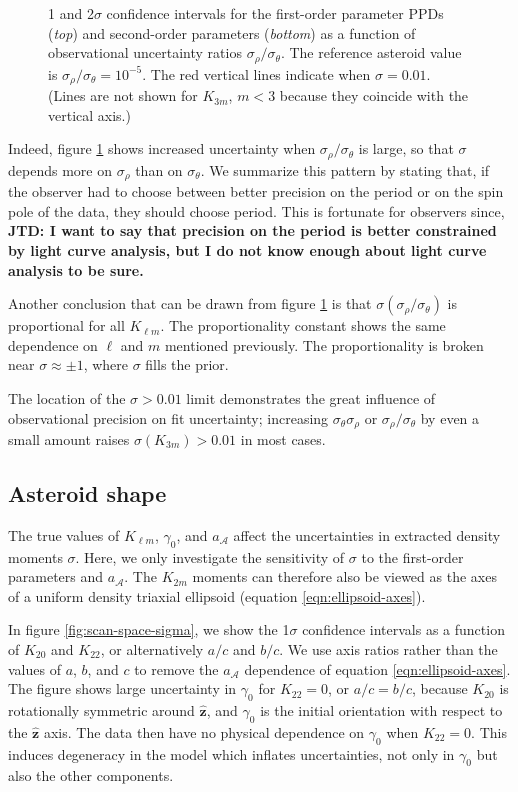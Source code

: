 \documentclass[fleqn,usenatbib]{mnras}
\newcommand{\jtd}[1]{ {\bf{\color{red} JTD: #1}} }
\newcommand{\unit}[1]{\bm{\hat{#1}}}
\begin{document}
\begin{figure}
  \caption{1 and 2$\sigma$ confidence intervals for the first-order parameter PPDs (\textit{top}) and second-order parameters (\textit{bottom}) as a function of observational uncertainty ratios $\sigma_\rho / \sigma_\theta$. The reference asteroid value is $\sigma_\rho/ \sigma_\theta =10^{-5}$. The red vertical lines indicate when $\sigma = 0.01$. (Lines are not shown for $K_{3m}$, $m < 3$ because they coincide with the vertical axis.)}
  \label{fig:scan-ratio}
\end{figure}

Indeed, figure  \ref{fig:scan-ratio} shows increased uncertainty when $\sigma_\rho/\sigma_\theta$ is large, so that $\sigma$ depends more on $\sigma_\rho$ than on $\sigma_\theta$. We summarize this pattern by stating that, if the observer had to choose between better precision on the period or on the spin pole of the data, they should choose period. This is fortunate for observers since, \jtd{I want to say that precision on the period is better constrained by light curve analysis, but I do not know enough about light curve analysis to be sure.}

Another conclusion that can be drawn from figure \ref{fig:scan-ratio} is that $\sigma(\sigma_\rho/\sigma_\theta)$ is proportional for all $K_{\ell m}$. The proportionality constant shows the same dependence on $\ell$ and $m$ mentioned previously. The proportionality is broken near $\sigma \approx \pm 1$, where $\sigma$ fills the prior.

The location of the $\sigma > 0.01$ limit demonstrates the great influence of observational precision on fit uncertainty; increasing $\sigma_\theta \sigma_\rho$ or $\sigma_\rho / \sigma_\theta$ by even a small amount raises $\sigma(K_{3m}) > 0.01$ in most cases.



\subsection{Asteroid shape}
\label{sec:scan-shape}

The true values of $K_{\ell m}$, $\gamma_0$, and $a_\mathcal{A}$ affect the uncertainties in extracted density moments $\sigma$. Here, we only investigate the sensitivity of $\sigma$ to the first-order parameters and $a_\mathcal{A}$. The $K_{2m}$ moments can therefore also be viewed as the axes of a uniform density triaxial ellipsoid (equation \ref{eqn:ellipsoid-axes}).

In figure \ref{fig:scan-space-sigma}, we show the 1$\sigma$ confidence intervals as a function of $K_{20}$ and $K_{22}$, or alternatively $a/c$ and $b/c$. We use axis ratios rather than the values of $a$, $b$, and $c$ to remove the $a_\mathcal{A}$ dependence of equation \ref{eqn:ellipsoid-axes}. The figure shows large uncertainty in $\gamma_0$ for $K_{22}=0$, or $a/c=b/c$, because $K_{20}$ is rotationally symmetric around $\unit z$, and $\gamma_0$ is the initial orientation with respect to the $\unit z$ axis. The data then have no physical dependence on $\gamma_0$ when $K_{22}=0$. This induces degeneracy in the model which inflates uncertainties, not only in $\gamma_0$ but also the other components.
\end{document}
